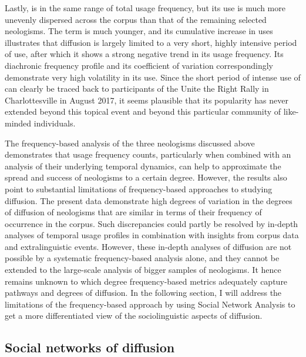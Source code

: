 \documentclass[
  a4paper,
  abstract=on,
  captions=tableabove
  ]{scrartcl}
\begin{document}
        Lastly,  is in the same range of total usage frequency, but its use is much more unevenly dispersed across the corpus than that of the remaining selected neologisms. The term is much younger, and its cumulative increase in uses illustrates that diffusion is largely limited to a very short, highly intensive period of use, after which it shows a strong negative trend in its usage frequency. Its diachronic frequency profile and its coefficient of variation correspondingly demonstrate very high volatility in its use. Since the short period of intense use of  can clearly be traced back to participants of the Unite the Right Rally in Charlottesville in August 2017, it seems plausible that its popularity has never extended beyond this topical event and beyond this particular community of like-minded individuals.
        
        The frequency-based analysis of the three neologisms discussed above demonstrates that usage frequency counts, particularly when combined with an analysis of their underlying temporal dynamics, can help to approximate the spread and success of neologisms to a certain degree. However, the results also point to substantial limitations of frequency-based approaches to studying diffusion. The present data demonstrate high degrees of variation in the degrees of diffusion of neologisms that are similar in terms of their frequency of occurrence in the corpus. Such discrepancies could partly be resolved by in-depth analyses of temporal usage profiles in combination with insights from corpus data and extralinguistic events. However, these in-depth analyses of diffusion are not possible by a systematic frequency-based analysis alone, and they cannot be extended to the large-scale analysis of bigger samples of neologisms. It hence remains unknown to which degree frequency-based metrics adequately capture pathways and degrees of diffusion. In the following section, I will address the limitations of the frequency-based approach by using Social Network Analysis to get a more differentiated view of the sociolinguistic aspects of diffusion.


  \subsection{Social networks of diffusion}
    \label{subsec:sna}
\end{document}
